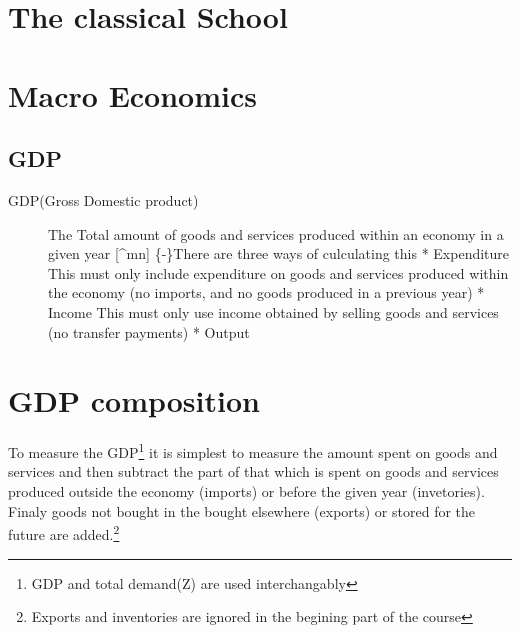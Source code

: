 \documentclass[twocolumn]{article}
\date{}
\begin{document}
\hypertarget{the-classical-school}{%
\section{The classical School}\label{the-classical-school}}

\hypertarget{macro-economics}{%
\section{Macro Economics}\label{macro-economics}}

\hypertarget{gdp}{%
\subsection{GDP}\label{gdp}}

\begin{description}
\item[GDP(Gross Domestic product)]
The Total amount of goods and services produced within an economy in a
given year {[}\^{}mn{]} \{-\}There are three ways of culculating this *
Expenditure This must only include expenditure on goods and services
produced within the economy (no imports, and no goods produced in a
previous year) * Income This must only use income obtained by selling
goods and services (no transfer payments) * Output
\end{description}

\hypertarget{gdp-composition}{%
\section{GDP composition}\label{gdp-composition}}

To measure the GDP\footnote{GDP and total demand(Z) are used
  interchangably} it is simplest to measure the amount spent on goods
and services and then subtract the part of that which is spent on goods
and services produced outside the economy (imports) or before the given
year (invetories). Finaly goods not bought in the bought elsewhere
(exports) or stored for the future are added.\footnote{Exports and
  inventories are ignored in the begining part of the course}
\end{document}
